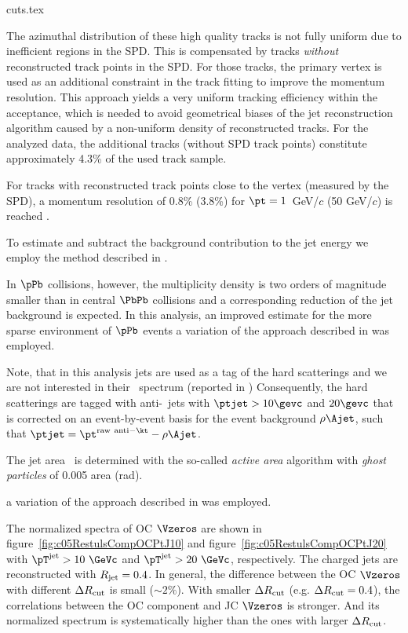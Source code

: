 cuts.tex


The azimuthal distribution of these high quality tracks is not fully uniform due to inefficient regions in the SPD.
This is compensated by tracks \textit{without} reconstructed track points in the SPD. 
For those tracks, the primary vertex is used as an additional constraint in the track fitting to improve the momentum resolution. 
This approach yields a very uniform tracking efficiency within the acceptance, which is needed to avoid geometrical biases of the jet reconstruction algorithm caused by a non-uniform density of reconstructed  tracks.
For the analyzed data, the additional tracks (without SPD track points) constitute approximately 4.3\% of the used track sample. 

For tracks with reconstructed track points close to the vertex (measured by the SPD), a momentum resolution of  0.8\% (3.8\%) for $\pt = 1$~GeV/$c$ (50 GeV/$c$) is reached \cite{Abelev:2014ffa}. 

To estimate and subtract the background contribution to the jet energy we employ the method described in \cite{Adam:2015hoa,Abelev:2013kqa}. 

In $\pPb$ collisions, however, the multiplicity density is two orders of magnitude smaller than in central $\PbPb$ collisions \cite{ALICE:2012xs} and a corresponding reduction of the jet background is expected. 
In this analysis, an improved estimate for the more sparse environment of $\pPb$ events a variation \cite{Adam:2015hoa} of the approach described in \cite{Chatrchyan:2012tt} was employed. 

Note, that in this analysis jets are used as a tag of the hard scatterings and we are not interested in their \pt\ spectrum (reported in )
Consequently, the hard scatterings are tagged with anti-\kt\ jets with $\ptjet > 10 \gevc$ and $20 \gevc$ that is corrected on an event-by-event basis for the event background $\rho \Ajet$, such that $\ptjet = \pt^{{\rm raw~anti-\kt}} - \rho \Ajet$.

The jet area \Ajet\ is determined with the so-called \emph{active area} algorithm \cite{Cacciari:2008gn} with \emph{ghost particles} of 0.005 area (rad). 

a variation  of the approach described in \cite{Chatrchyan:2012tt} was employed. 



The normalized spectra of OC $\Vzeros$ are shown in
figure~\ref{fig:c05RestulsCompOCPtJ10} and
figure~\ref{fig:c05RestulsCompOCPtJ20} with $\pT^{\rm jet}>10~\GeVc$ and
$\pT^{\rm jet}>20~\GeVc$, respectively.
The charged jets are reconstructed with $R_{\rm jet}=0.4$.
In general, the difference between the OC $\Vzeros$ with
different $\Delta R_{\rm cut}$ is small ($\sim 2\%$).
With smaller $\Delta R_{\rm cut}$ (e.g. $\Delta R_{\rm cut}=0.4$),
the correlations between the OC component and JC $\Vzeros$ is stronger.
And its normalized spectrum is systematically higher
than the ones with  larger $\Delta R_{\rm cut}$.


